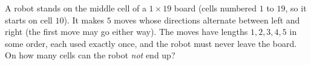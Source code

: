 A robot stands on the middle cell of a $1\times19$ board (cells numbered $1$ to $19$, so it starts on cell $10$). It makes $5$ moves whose directions alternate between left and right (the first move may go either way). The moves have lengths $1,2,3,4,5$ in some order, each used exactly once, and the robot must never leave the board. On how many cells can the robot \emph{not} end up?

